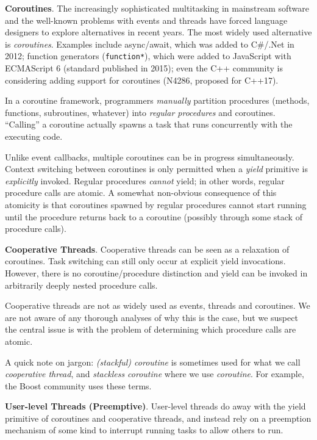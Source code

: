 \documentclass[9pt,preprint]{sigplanconf-2}
\begin{document}
\textbf{Coroutines}.
The increasingly sophisticated multitasking in mainstream software and the well-known problems with events and threads have forced language designers to explore alternatives in recent years.
The most widely used alternative is \emph{coroutines}\footnotemark{}.
Examples include async/await, which was added to C\#/.Net in 2012; function generators (\texttt{function*}), which were added to JavaScript with ECMAScript 6 (standard published in 2015); even the C++ community is considering adding support for coroutines (N4286, proposed for C++17).


In a coroutine framework, programmers \emph{manually} partition procedures (methods, functions, subroutines, whatever) into \emph{regular procedures} and coroutines.
``Calling'' a coroutine actually spawns a task that runs concurrently with the executing code.

Unlike event callbacks, multiple coroutines can be in progress simultaneously.
Context switching between coroutines is only permitted when a \emph{yield} primitive is \emph{explicitly} invoked.
Regular procedures \emph{cannot} yield; in other words, regular procedure calls are atomic.
A somewhat non-obvious consequence of this atomicity is that coroutines spawned by regular procedures cannot start running until the procedure returns back to a coroutine (possibly through some stack of procedure calls).

\textbf{Cooperative Threads}.
Cooperative threads can be seen as a relaxation of coroutines.
Task switching can still only occur at explicit yield invocations.
However, there is no coroutine/procedure distinction and yield can be invoked in arbitrarily deeply nested procedure calls.

Cooperative threads are not as widely used as events, threads and coroutines.
We are not aware of any thorough analyses of why this is the case, but we suspect the central issue is with the problem of determining which procedure calls are atomic.

A quick note on jargon: \emph{(stackful) coroutine} is sometimes used for what we call \emph{cooperative thread}, and \emph{stackless coroutine} where we use \emph{coroutine}.
For example, the Boost community uses these terms.

\textbf{User-level Threads (Preemptive)}.
User-level threads do away with the yield primitive of coroutines and cooperative threads, and instead rely on a preemption mechanism of some kind to interrupt running tasks to allow others to run.
\end{document}
